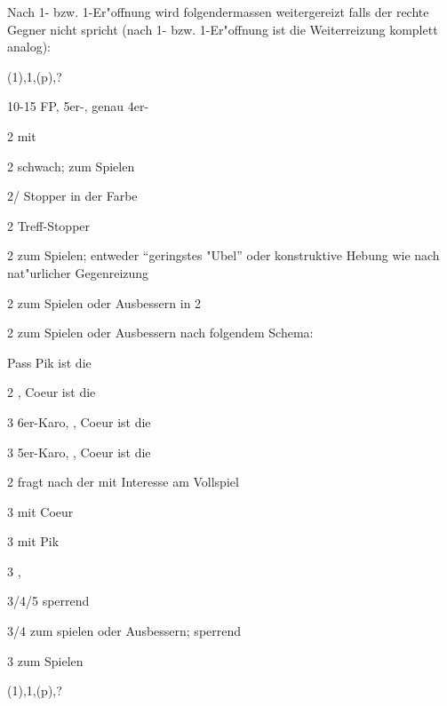 \begin{appendix}
Nach 1\tre{}- bzw. 1\coe{}-Er"offnung wird folgendermassen weitergereizt falls
der rechte Gegner nicht spricht (nach 1\kar{}- bzw. 1\pik{}-Er"offnung ist die
Weiterreizung komplett analog):

\bdsc
	\item[(1\tre)\sep{}1\SA{}\sep{}(p)\sep{}?]~
		
		10-15 FP, 5\pl{}er-\ka, genau 4er-\ofa
		\bdsc
			\item[2\tre] \inv{}\pl mit \ka
				\bdsc
					\item[2\kar] schwach; zum Spielen
					\item[2\coe/\pi] Stopper in der Farbe
					\item[2\SA] Treff-Stopper
				\edsc
			\item[2\kar] zum Spielen; entweder "`geringstes "Ubel"'
oder konstruktive Hebung wie nach nat"urlicher Gegenreizung
			\item[2\coe] zum Spielen oder Ausbessern in 2\pik
			\item[2\pik] zum Spielen oder Ausbessern nach folgendem
Schema:
				\bdsc
					\item[Pass] Pik ist die \ofa
					\item[2\nt] \maxi, Coeur ist die \ofa
					\item[3\kar] 6\pl{}er-Karo, \mini, Coeur
ist die \ofa
					\item[3\coe] 5er-Karo, \mini, Coeur ist
die \ofa
				\edsc
			\item[2\SA] fragt nach der \ofa mit Interesse am
Vollspiel
				\bdsc
					\item[3\tre] \maxi mit Coeur
					\item[3\kar] \maxi mit Pik
					\item[3\of] \nat, \mini
				\edsc
			\item[3\kar/4\kar/5\kar] sperrend
			\item[3\of/4\of] zum spielen oder Ausbessern; sperrend
			\item[3\SA] zum Spielen
			
		\edsc
	\item[(1\coe)\sep{}1\SA{}\sep{}(p)\sep{}?]~


\end{appendix}

